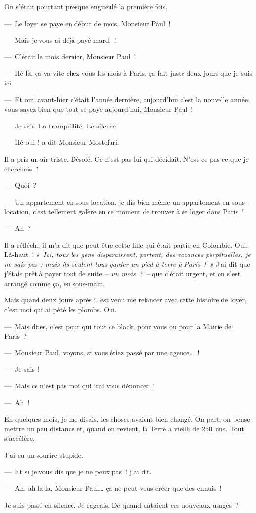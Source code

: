 \documentclass[twoside]{book} %
\begin{document}
\noindent On s’était pourtant presque engueulé la première fois.\par
— Le loyer se paye en début de mois, Monsieur Paul !\par
— Mais je vous ai déjà payé mardi !\par
— C’était le mois dernier, Monsieur Paul !\par
— Hé là, ça va vite chez vous les mois à Paris, ça fait juste deux jours que je suis ici.\par
— Et oui, avant-hier c’était l’année dernière, aujourd’hui c’est la nouvelle année, vous savez bien que tout se paye aujourd’hui, Monsieur Paul !\par
— Je sais. La tranquillité. Le silence.\par
— Hé oui ! a dit Monsieur Mostefari.\par
Il a pris un air triste. Désolé. Ce n’est pas lui qui décidait. N’est-ce pas ce que je cherchais ?\par
— Quoi ?\par
— Un appartement en sous-location, je dis bien même un appartement en sous-location, c’est tellement galère en ce moment de trouver à se loger dans Paris !\par
— Ah ?\par
Il a réfléchi, il m’a dit que peut-être cette fille qui était partie en Colombie. Oui. Là-haut ! \emph{« Ici, tous les gens disparaissent, partent, des vacances perpétuelles, je ne sais pas ; mais ils veulent tous garder un pied-à-terre à Paris ! »} J’ai dit que j’étais prêt à payer tout de suite \emph{– un mois ? –} que c’était urgent, et on s’est arrangé comme ça, en sous-main.\par
Mais quand deux jours après il est venu me relancer avec cette histoire de loyer, c’est moi qui ai pété les plombs. Oui.\par
— Mais dites, c’est pour qui tout ce black, pour vous ou pour la Mairie de Paris ?\par
— Monsieur Paul, voyons, si vous étiez passé par une agence… !\par
— Je sais !\par
— Mais ce n’est pas moi qui irai vous dénoncer !\par
— Ah !\par
En quelques mois, je me disais, les choses avaient bien changé. On part, on pense mettre un peu distance et, quand on revient, la Terre a vieilli de 250 ans. Tout s’accélère.\par
J’ai eu un sourire stupide.\par
— Et si je vous dis que je ne peux pas ! j’ai dit.\par
— Ah, ah la-la, Monsieur Paul… ça ne peut vous créer que des ennuis !\par
Je suis passé en silence. Je rageais. De quand dataient ces nouveaux usages ?
\end{document}
